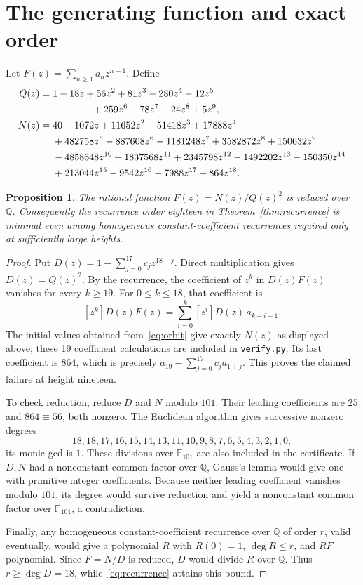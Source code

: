 \documentclass[11pt,a4paper]{article}
\newtheorem{proposition}[theorem]{Proposition}
\newcommand{\Q}{\mathbb Q}
\begin{document}
\section{The generating function and exact order}\label{sec:rational}

Let $F(z)=\sum_{n\geq1}a_nz^{n-1}$. Define
\begin{align*}
 Q(z)={}&1-18z+56z^2+81z^3-280z^4-12z^5\\
        &\hspace{14mm}+259z^6-78z^7-24z^8+5z^9,\\
 N(z)={}&40-1072z+11652z^2-51418z^3+17888z^4\\
        &+482758z^5-887608z^6-1181248z^7+3582872z^8+150632z^9\\
        &-4858648z^{10}+1837568z^{11}+2345798z^{12}
                -1492202z^{13}-150350z^{14}\\
        &+213044z^{15}-9542z^{16}-7988z^{17}+864z^{18}.
\end{align*}

\begin{proposition}\label{prop:gf}
The rational function $F(z)=N(z)/Q(z)^2$ is reduced over $\Q$.
Consequently the recurrence order eighteen in
Theorem~\ref{thm:recurrence} is minimal even among homogeneous
constant-coefficient recurrences required only at sufficiently large heights.
\end{proposition}
\begin{proof}
Put $D(z)=1-\sum_{j=0}^{17}c_jz^{18-j}$. Direct multiplication gives
$D(z)=Q(z)^2$. By the recurrence, the coefficient of $z^k$ in $D(z)F(z)$
vanishes for every $k\geq19$. For $0\leq k\leq18$, that coefficient is
\[
 [z^k]D(z)F(z)=\sum_{i=0}^k [z^i]D(z)\,a_{k-i+1}.
\]
The initial values obtained from~\eqref{eq:orbit} give exactly $N(z)$
as displayed above; these 19 coefficient calculations are included in
\texttt{verify.py}. Its last coefficient is $864$, which is precisely
$a_{19}-\sum_{j=0}^{17}c_ja_{1+j}$. This proves the claimed failure at
height nineteen.

To check reduction, reduce $D$ and $N$ modulo $101$. Their leading
coefficients are $25$ and $864\equiv56$, both nonzero. The Euclidean
algorithm gives successive nonzero degrees
\[
18,18,17,16,15,14,13,11,10,9,8,7,6,5,4,3,2,1,0;
\]
its monic gcd is $1$. These divisions over $\mathbb F_{101}$ are also
included in the certificate. If $D,N$ had a nonconstant common factor
over $\Q$, Gauss's lemma would give one with primitive integer
coefficients. Because neither leading coefficient vanishes modulo $101$,
its degree would survive reduction and yield a nonconstant common factor
over $\mathbb F_{101}$, a contradiction.

Finally, any homogeneous constant-coefficient recurrence over $\Q$ of order
$r$, valid eventually,
would give a polynomial $R$ with $R(0)=1$, $\deg R\leq r$, and $RF$
polynomial. Since $F=N/D$ is reduced, $D$ would divide $R$ over $\Q$.
Thus $r\geq\deg D=18$, while~\eqref{eq:recurrence} attains this bound.
\end{proof}
\end{document}
